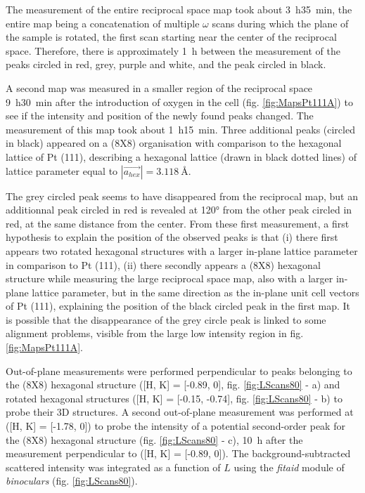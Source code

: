 The measurement of the entire reciprocal space map took about \qty{3}{\hour}\qty{35}{\minute}, the entire map being a concatenation of multiple $\omega$ scans during which the plane of the sample is rotated, the first scan starting near the center of the reciprocal space.
Therefore, there is approximately \qty{1}{\hour} between the measurement of the peaks circled in red, grey, purple and white, and the peak circled in black.

A second map was measured in a smaller region of the reciprocal space \qty{9}{\hour}\qty{30}{\minute} after the introduction of oxygen in the cell (fig. \ref{fig:MapsPt111A}) to see if the intensity and position of the newly found peaks changed.
The measurement of this map took about \qty{1}{\hour}\qty{15}{\minute}.
Three additional peaks (circled in black) appeared on a (8X8) organisation with comparison to the hexagonal lattice of Pt (111), describing a hexagonal lattice (drawn in black dotted lines) of lattice parameter equal to $|\vec{a_{hex}}| = \qty{3.118}{\angstrom}$.

The grey circled peak seems to have disappeared from the reciprocal map, but an additionnal peak circled in red is revealed at \ang{120} from the other peak circled in red, at the same distance from the center.
From these first measurement, a first hypothesis to explain the position of the observed peaks is that (i) there first appears two rotated hexagonal structures with a larger in-plane lattice parameter in comparison to Pt (111), (ii) there secondly appears a (8X8) hexagonal structure while measuring the large reciprocal space map, also with a larger in-plane lattice parameter, but in the same direction as the in-plane unit cell vectors of Pt (111), explaining the position of the black circled peak in the first map.
It is possible that the disappearance of the grey circle peak is linked to some alignment problems, visible from the large low intensity region in fig. \ref{fig:MapsPt111A}.

Out-of-plane measurements were performed perpendicular to peaks belonging to the (8X8) hexagonal structure ([H, K] = [-0.89, 0], fig. \ref{fig:LScans80} - a) and rotated hexagonal structures ([H, K] = [-0.15, -0.74], fig. \ref{fig:LScans80} - b) to probe their 3D structures.
A second out-of-plane measurement was performed at ([H, K] = [-1.78, 0]) to probe the intensity of a potential second-order peak for the (8X8) hexagonal structure (fig. \ref{fig:LScans80} - c), \qty{10}{\hour} after the measurement perpendicular to ([H, K] = [-0.89, 0]).
The background-subtracted scattered intensity was integrated as a function of $L$ using the \textit{fitaid} module of \textit{binoculars} (fig. \ref{fig:LScans80}).

